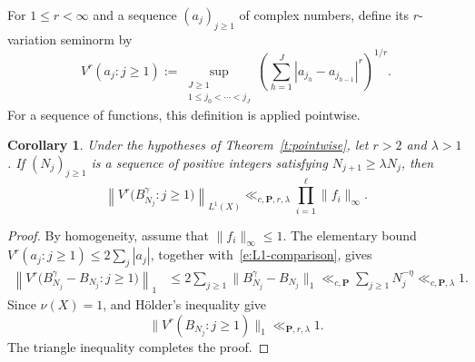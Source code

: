 \documentclass[12pt]{amsart}
\newcommand{\1}{\mathbf 1}
\newtheorem{corollary}[theorem]{Corollary}
\begin{document}
For $1\leq r<\infty$ and a sequence $(a_j)_{j\geq1}$ of
complex numbers, define its $r$-variation seminorm by
\[
 V^r(a_j:j\geq1)
 :=\sup_{\substack{J\geq1\\1\leq j_0<\cdots<j_J}}
 \left(\sum_{h=1}^{J}
 |a_{j_h}-a_{j_{h-1}}|^r\right)^{1/r}.
\]
For a sequence of functions, this definition is applied pointwise.
\begin{corollary}
\label{c:long-variation}
Under the hypotheses of Theorem~\ref{t:pointwise}, let $r>2$
and $\lambda>1$. If $(N_j)_{j\geq1}$ is a sequence of positive
integers satisfying $N_{j+1}\geq\lambda N_j$, then
\[
 \left\|V^r\bigl(B_{N_j}^\gamma:j\geq1\bigr)\right\|_{L^1(X)}
 \ll_{c,\mathbf P,r,\lambda}
 \prod_{i=1}^{\ell}\|f_i\|_\infty.
\]
\end{corollary}

\begin{proof}
By homogeneity, assume that $\|f_i\|_\infty\leq1$.
The elementary bound $V^r(a_j:j\geq1)\leq2\sum_j|a_j|$,
together with~\eqref{e:L1-comparison}, gives
\begin{align*}
 \left\|V^r\bigl(B_{N_j}^\gamma-B_{N_j}:j\geq1\bigr)\right\|_1
 &\leq2\sum_{j\geq1}
 \|B_{N_j}^\gamma-B_{N_j}\|_1\ll_{c,\mathbf P}\sum_{j\geq1}N_j^{-\eta}
 \ll_{c,\mathbf P,\lambda}1.
\end{align*}
Since $\nu(X)=1$, \cite[Theorem~1.1(iv)]{MirekWanWright}
and H\"older's inequality give
$$\|V^r(B_{N_j}:j\geq1)\|_1\ll_{\mathbf P,r,\lambda}1.$$
The triangle inequality completes the proof.
\end{proof}
\end{document}
